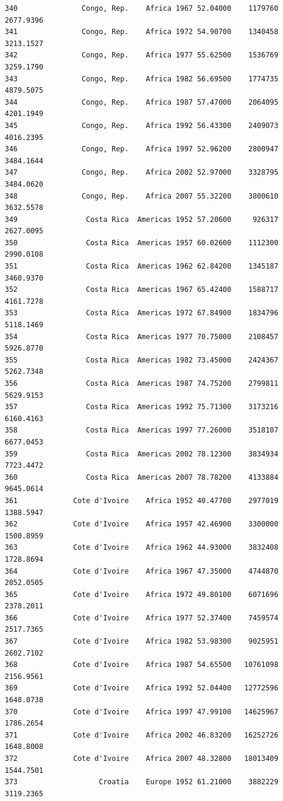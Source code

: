 \documentclass[
  letterpaper,
  DIV=11,
  numbers=noendperiod]{scrreprt}
\begin{document}
\begin{verbatim}
340               Congo, Rep.    Africa 1967 52.04000    1179760   2677.9396
341               Congo, Rep.    Africa 1972 54.90700    1340458   3213.1527
342               Congo, Rep.    Africa 1977 55.62500    1536769   3259.1790
343               Congo, Rep.    Africa 1982 56.69500    1774735   4879.5075
344               Congo, Rep.    Africa 1987 57.47000    2064095   4201.1949
345               Congo, Rep.    Africa 1992 56.43300    2409073   4016.2395
346               Congo, Rep.    Africa 1997 52.96200    2800947   3484.1644
347               Congo, Rep.    Africa 2002 52.97000    3328795   3484.0620
348               Congo, Rep.    Africa 2007 55.32200    3800610   3632.5578
349                Costa Rica  Americas 1952 57.20600     926317   2627.0095
350                Costa Rica  Americas 1957 60.02600    1112300   2990.0108
351                Costa Rica  Americas 1962 62.84200    1345187   3460.9370
352                Costa Rica  Americas 1967 65.42400    1588717   4161.7278
353                Costa Rica  Americas 1972 67.84900    1834796   5118.1469
354                Costa Rica  Americas 1977 70.75000    2108457   5926.8770
355                Costa Rica  Americas 1982 73.45000    2424367   5262.7348
356                Costa Rica  Americas 1987 74.75200    2799811   5629.9153
357                Costa Rica  Americas 1992 75.71300    3173216   6160.4163
358                Costa Rica  Americas 1997 77.26000    3518107   6677.0453
359                Costa Rica  Americas 2002 78.12300    3834934   7723.4472
360                Costa Rica  Americas 2007 78.78200    4133884   9645.0614
361             Cote d'Ivoire    Africa 1952 40.47700    2977019   1388.5947
362             Cote d'Ivoire    Africa 1957 42.46900    3300000   1500.8959
363             Cote d'Ivoire    Africa 1962 44.93000    3832408   1728.8694
364             Cote d'Ivoire    Africa 1967 47.35000    4744870   2052.0505
365             Cote d'Ivoire    Africa 1972 49.80100    6071696   2378.2011
366             Cote d'Ivoire    Africa 1977 52.37400    7459574   2517.7365
367             Cote d'Ivoire    Africa 1982 53.98300    9025951   2602.7102
368             Cote d'Ivoire    Africa 1987 54.65500   10761098   2156.9561
369             Cote d'Ivoire    Africa 1992 52.04400   12772596   1648.0738
370             Cote d'Ivoire    Africa 1997 47.99100   14625967   1786.2654
371             Cote d'Ivoire    Africa 2002 46.83200   16252726   1648.8008
372             Cote d'Ivoire    Africa 2007 48.32800   18013409   1544.7501
373                   Croatia    Europe 1952 61.21000    3882229   3119.2365

\end{verbatim}
\end{document}
